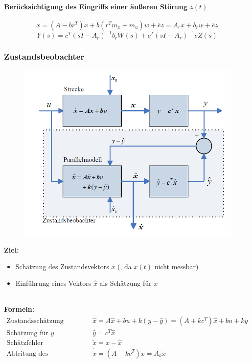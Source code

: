 \documentclass[10pt,a4paper]{article}
\begin{document}
\paragraph{Berücksichtigung des Eingriffs einer äußeren Störung $z(t)$}
$$
	\dot x = (A - br^T) x + b (r^T m_x + m_u) w + \bar e z = A_r x + b_r w + \bar e z
$$
$$
	Y(s) = c^T(sI-A_r)^{-1}b_rW(s) + c^T(sI-A_r)^{-1}\bar eZ(s)
$$

\subsubsection{Zustandsbeobachter}
\begin{figure}[H]
	\includegraphics[width=0.7\columnwidth]{imgs/abb7_12.png}
\end{figure}

\textbf{Ziel:}
\begin{itemize}
	\item Schätzung des Zustandsvektors $x$ (, da $x(t)$ nicht messbar)
	\item Einführung eines Vektors $\hat x$ als Schätzung für $x$
\end{itemize} ~\\

\textbf{Formeln:} ~\\
$
	\begin{array}{ll}
		\text{Zustandsschätzung} & \dot {\hat x} = A \hat x + bu + k(y - \hat y) = (A + kc^T)\hat x + bu + ky\\
		\text{Schätzung für }y & \hat y = c^T\hat x \\
		\text{Schätzfehler} & \tilde{x} = x - \hat x \\
		\text{Ableitung des Schätzfehlers} & \dot{\tilde x} = (A - kc^T)\tilde x = A_k \tilde x
	\end{array}
$ \\~\\
\end{document}
